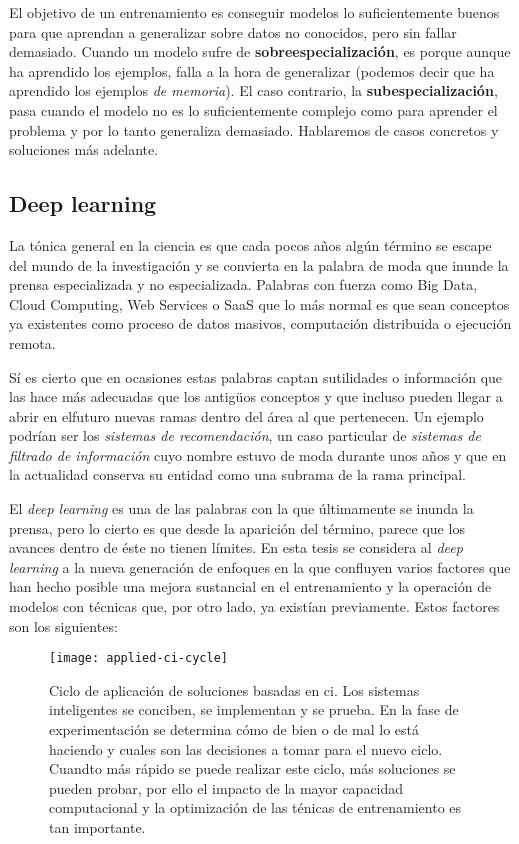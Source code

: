 El objetivo de un entrenamiento es conseguir modelos lo suficientemente buenos para que aprendan a generalizar sobre datos no conocidos, pero sin fallar demasiado. Cuando un modelo sufre de \textbf{sobreespecialización}, es porque aunque ha aprendido los ejemplos, falla a la hora de generalizar (podemos decir que ha aprendido los ejemplos \textit{de memoria}). El caso contrario, la \textbf{subespecialización}, pasa cuando el modelo no es lo suficientemente complejo como para aprender el problema y por lo tanto generaliza demasiado. Hablaremos de casos concretos y soluciones más adelante.

\subsection{Deep learning}
\label{ss:deep-learning}

La tónica general en la ciencia es que cada pocos años algún término se escape del mundo de la investigación y se convierta en la palabra de moda que inunde la prensa especializada y no especializada. Palabras con fuerza como Big Data, Cloud Computing, Web Services o SaaS que lo más normal es que sean conceptos ya existentes como proceso de datos masivos, computación distribuida o ejecución remota.

Sí es cierto que en ocasiones estas palabras captan sutilidades o información que las hace más adecuadas que los antigüos conceptos y que incluso pueden llegar a abrir en elfuturo nuevas ramas dentro del área al que pertenecen. Un ejemplo podrían ser los \textit{sistemas de recomendación}, un caso particular de \textit{sistemas de filtrado de información} cuyo nombre estuvo de moda durante unos años y que en la actualidad conserva su entidad como una subrama de la rama principal.

El \textit{deep learning} es una de las palabras con la que últimamente se inunda la prensa, pero lo cierto es que desde la aparición del término, parece que los avances dentro de éste no tienen límites. En esta tesis se considera al \textit{deep learning} a la nueva generación de enfoques en la que confluyen varios factores que han hecho posible una mejora sustancial en el entrenamiento y la operación de modelos con técnicas que, por otro lado, ya existían previamente. Estos factores son los siguientes:

\begin{figure}[t]
	\centering
	\texttt{[image: applied-ci-cycle]}
	\caption[Ciclo de aplicación de soluciones basadas en ]{Ciclo de aplicación de soluciones basadas en \acrlong{ci}. Los sistemas inteligentes se conciben, se implementan y se prueba. En la fase de experimentación se determina cómo de bien o de mal lo está haciendo y cuales son las decisiones a tomar para el nuevo ciclo. Cuandto más rápido se puede realizar este ciclo, más soluciones se pueden probar, por ello el impacto de la mayor capacidad computacional y la optimización de las ténicas de entrenamiento es tan importante.}
	\label{fig:applied-ci-cycle}
\end{figure}

